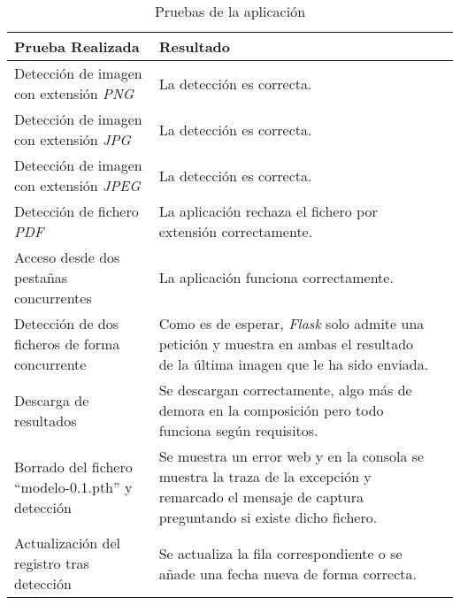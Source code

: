 \begin{table}[h]
	\begin{center}
		\begin{tabular}{>{\centering\arraybackslash}m{5cm} >{\centering\arraybackslash}m{5cm} p{9cm}}
		    \hline
			\textbf{Prueba Realizada}  & \textbf{Resultado}\\ \hline \hline
   		            Detección de imagen con extensión \emph{PNG} & La detección es correcta. \\ \hline
			    	Detección de imagen con extensión \emph{JPG} & La detección es correcta. \\ \hline
    			    Detección de imagen con extensión \emph{JPEG} & La detección es correcta. \\ \hline
			    	Detección de fichero \emph{PDF} & La aplicación rechaza el fichero por extensión correctamente. \\ \hline
			    	Acceso desde dos pestañas concurrentes & La aplicación funciona correctamente. \\ \hline
			    	Detección de dos ficheros de forma concurrente & Como es de esperar, \emph{Flask} solo admite una petición y muestra en ambas el resultado de la última imagen que le ha sido enviada. \\ \hline
    			    Descarga de resultados & Se descargan correctamente, algo más de demora en la composición pero todo funciona según requisitos. \\ \hline
        			Borrado del fichero ``modelo-0.1.pth'' y detección & Se muestra un error web y en la consola se muestra la traza de la excepción y remarcado el mensaje de captura preguntando si existe dicho fichero. \\ \hline
        			Actualización del registro tras detección & Se actualiza la fila correspondiente o se añade una fecha nueva de forma correcta. \\ \hline
		\end{tabular}
		\caption{Pruebas de la aplicación}
		\label{tablapruebas2}
	\end{center}
\end{table}


